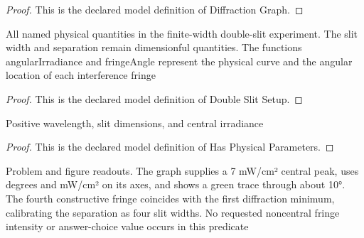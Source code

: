 \begin{proof}
  This is the declared model definition of Diffraction Graph.
\end{proof}
\begin{definition}
  \label{def:physics:phyx-mini-0082:phyxminiproblems-problemphyxmini0082-doubleslitsetup}
  All named physical quantities in the finite-width double-slit experiment. The slit width and separation remain dimensionful quantities. The functions angularIrradiance and fringeAngle represent the physical curve and the angular location of each interference fringe
\end{definition}
\begin{proof}
  This is the declared model definition of Double Slit Setup.
\end{proof}
\begin{definition}
  \label{def:physics:phyx-mini-0082:phyxminiproblems-problemphyxmini0082-hasphysicalparameters}
  Positive wavelength, slit dimensions, and central irradiance
\end{definition}
\begin{proof}
  This is the declared model definition of Has Physical Parameters.
\end{proof}
\begin{definition}
  \label{def:physics:phyx-mini-0082:phyxminiproblems-problemphyxmini0082-matchesproblemandfigure}
  Problem and figure readouts. The graph supplies a 7 mW/cm² central peak, uses degrees and mW/cm² on its axes, and shows a green trace through about 10°. The fourth constructive fringe coincides with the first diffraction minimum, calibrating the separation as four slit widths. No requested noncentral fringe intensity or answer-choice value occurs in this predicate
\end{definition}
